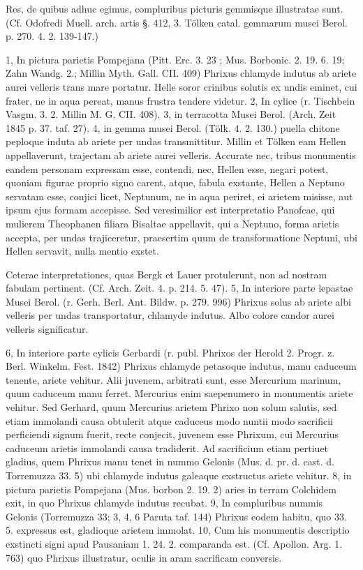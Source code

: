 \documentclass[a4paper, 11pt, oneside, polutonikogreek, german]{article}
\begin{document}
Res, de quibus adhuc egimus, compluribus picturis gemmisque illustratae sunt. (Cf. Odofredi Muell. arch. artis §. 412, 3. Tölken catal. gemmarum musei Berol. p. 270. 4. 2. 139-147.)

1, In pictura parietis Pompejana (Pitt. Erc. 3. 23 ; Mus. Borbonic. 2. 19. 6. 19; Zahn Wandg. 2.; Millin Myth. Gall. CII. 409) Phrixus chlamyde indutus ab ariete aurei velleris trans mare portatur. Helle soror crinibus solutis ex undis eminet, cui frater, ne in aqua pereat, manus frustra tendere videtur. 2, In cylice (r. Tischbein Vasgm. 3. 2. Millin M. G. CII. 408). 3, in terracotta Musei Berol. (Arch. Zeit 1845 p. 37. taf. 27). 4, in gemma musei Berol. (Tölk. 4. 2. 130.) puella chitone peploque induta ab ariete per undas transmittitur. Millin et Tölken eam Hellen appellaverunt, trajectam ab ariete aurei velleris. Accurate nec, tribus monumentis eandem personam expressam esse, contendi, nec, Hellen esse, negari potest, quoniam figurae proprio signo carent, atque, fabula exstante, Hellen a Neptuno servatam esse, conjici licet, Neptunum, ne in aqua periret, ei arietem misisse, aut ipsum ejus formam accepisse. Sed veresimilior est interpretatio Panofcae, qui mulierem Theophanen filiara Bisaltae appellavit, qui a Neptuno, forma arietis accepta, per undas trajiceretur, praesertim quum de transformatione Neptuni, ubi Hellen servavit, nulla mentio exstet.

Ceterae interpretationes, quas Bergk et Lauer protulerunt, non ad nostram fabulam pertinent. (Cf. Arch. Zeit. 4. p. 214. 5. 47). 5, In interiore parte lepastae Musei Berol. (r. Gerh. Berl. Ant. Bildw. p. 279. 996) Phrixus solus ab ariete albi velleris per undas transportatur, chlamyde indutus. Albo colore candor aurei velleris significatur.

6, In interiore parte cylicis Gerbardi (r. publ. Phrixos der Herold 2. Progr. z. Berl. Winkelm. Fest. 1842) Phrixus chlamyde petasoque indutus, manu caduceum tenente, ariete vehitur. Alii juvenem, arbitrati sunt, esse Mercurium marinum, quum caduceum manu ferret. Mercurius enim saepenumero in monumentis ariete vehitur. Sed Gerhard, quum Mercurius arietem Phrixo non solum salutis, sed etiam immolandi causa obtulerit atque caduceus modo nuntii modo sacrificii perficiendi signum fuerit, recte conjecit, juvenem esse Phrixum, cui Mercurius caduceum arietis immolandi causa tradiderit. Ad sacrificium etiam pertiuet gladius, quem Phrixus manu tenet in nummo Gelonis (Mus. d. pr. d. cast. d. Torremuzza 33. 5) ubi chlamyde indutus galeaque exstructus ariete vehitur. 8, in pictura parietis Pompejana (Mus. borbon 2. 19. 2) aries in terram Colchidem exit, in quo Phrixus chlamyde indutus recubat. 9, In compluribus nummis Gelonis (Torremuzza 33; 3, 4, 6 Paruta taf. 144) Phrixus eodem habitu, quo 33. 5. expressus est, gladioque arietem immolat. 10, Cum his monumentis descriptio exstincti signi apud Pausaniam 1. 24. 2. comparanda est. (Cf. Apollon. Arg. 1. 763) quo Phrixus illustratur, oculis in aram sacrificam conversis.
\end{document}
